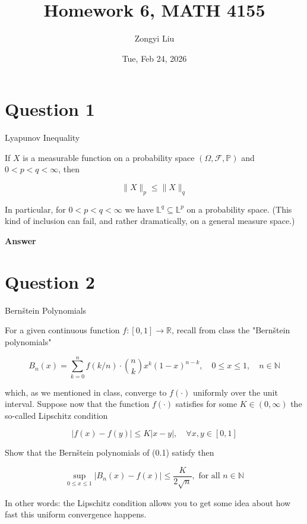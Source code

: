 \documentclass[letterpaper]{article}
\title{Homework 6, MATH 4155}
\author{Zongyi Liu}
\date{Tue, Feb 24, 2026}
\begin{document}
		\maketitle
		\section{Question 1}
		
		{\color{deepred} Lyapunov Inequality}
		
		 If $X$ is a measurable function on a probability space $(\Omega, \mathcal{F}, \mathbb{P})$ and $0<p<q<\infty$, then
		
		$$
		\|X\|_{p} \leq\|X\|_{q}
		$$
		
		In particular, for $0<p<q<\infty$ we have $\mathbb{L}^{q} \subseteq \mathbb{L}^{p}$ on a probability space. (This kind of inclusion can fail, and rather dramatically, on a general measure space.)
		
		\textbf{Answer}
		
		\clearpage
		
		\section{Question 2}
		
		{\color{deepred} Bernštein Polynomials}
		
		 For a given continuous function $f:[0,1] \rightarrow \mathbb{R}$, recall from class the "Bernštein polynomials"
		
		\begin{equation*}
			B_{n}(x)=\sum_{k=0}^{n} f(k / n) \cdot\binom{n}{k} x^{k}(1-x)^{n-k}, \quad 0 \leq x \leq 1, \quad n \in \mathbb{N} \tag{0.1}
		\end{equation*}
		
		
		which, as we mentioned in class, converge to $f(\cdot)$ uniformly over the unit interval. Suppose now that the function $f(\cdot)$ satisfies for some $K \in(0, \infty)$ the so-called Lipschitz condition
		
		$$
		|f(x)-f(y)| \leq K|x-y|, \quad \forall x, y \in[0,1]
		$$
		
		Show that the Bernštein polynomials of (0.1) satisfy then
		
		$$
		\sup _{0 \leq x \leq 1}\left|B_{n}(x)-f(x)\right| \leq \frac{K}{2 \sqrt{n}}, \text { for all } n \in \mathbb{N}
		$$
		
		In other words: the Lipschitz condition allows you to get some idea about how fast this uniform convergence happens.
		
\end{document}
